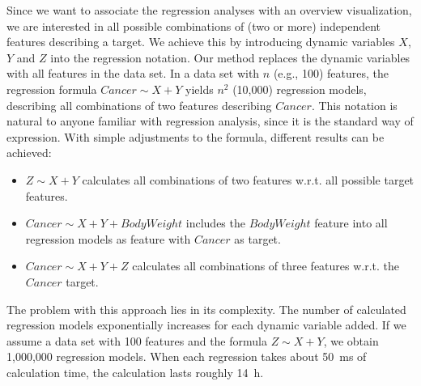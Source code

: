 \documentclass[journal]{style/vgtc} 			          %
\begin{document}
Since we want to associate the regression analyses with an overview visualization, we are interested in all possible combinations of (two or more) independent features describing a target.
We achieve this by introducing dynamic variables $X$, $Y$ and $Z$ into the regression notation.
Our method replaces the dynamic variables with all features in the data set.
In a data set with $n$ (e.g., 100) features, the regression formula $Cancer \sim X + Y$
%
yields $n^2$ (10,000) regression models, describing all combinations of two features describing $Cancer$.
This notation is natural to anyone familiar with regression analysis, since it is the standard way of expression.
With simple adjustments to the formula, different results can be achieved:
\begin{itemize}
	\item $Z \sim X + Y$ calculates all combinations of two features w.r.t. all possible target features.
	\item $Cancer \sim X + Y + BodyWeight$ includes the $BodyWeight$ feature into all regression models as feature with $Cancer$ as target.
	\item $Cancer \sim X + Y + Z$ calculates all combinations of three features w.r.t. the $Cancer$ target.
\end{itemize}
The problem with this approach lies in its complexity.
The number of calculated regression models exponentially increases for each dynamic variable added.
If we assume a data set with 100 features and the formula $Z \sim X + Y$, we obtain 1,000,000 regression models.
When each regression takes about 50~ms of calculation time, the calculation lasts roughly 14~h.
\end{document}
